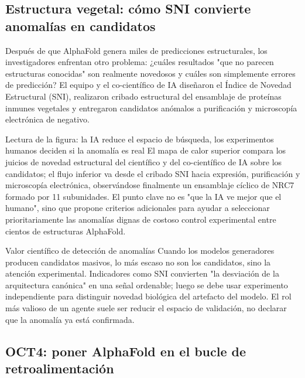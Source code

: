\subsection{Estructura vegetal: cómo SNI convierte anomalías en candidatos}

Después de que AlphaFold genera miles de predicciones estructurales, los investigadores enfrentan otro problema: ¿cuáles resultados "que no parecen estructuras conocidas" son realmente novedosos y cuáles son simplemente errores de predicción? El equipo y el co-científico de IA diseñaron el Índice de Novedad Estructural (SNI), realizaron cribado estructural del ensamblaje de proteínas inmunes vegetales y entregaron candidatos anómalos a purificación y microscopía electrónica de negativo.


\begin{knowledgebox}{Lectura de la figura: la IA reduce el espacio de búsqueda, los experimentos humanos deciden si la anomalía es real}
El mapa de calor superior compara los juicios de novedad estructural del científico y del co-científico de IA sobre los candidatos; el flujo inferior va desde el cribado SNI hacia expresión, purificación y microscopía electrónica, observándose finalmente un ensamblaje cíclico de NRC7 formado por 11 subunidades. El punto clave no es "que la IA ve mejor que el humano", sino que propone criterios adicionales para ayudar a seleccionar prioritariamente las anomalías dignas de costoso control experimental entre cientos de estructuras AlphaFold.
\end{knowledgebox}

\begin{importantbox}{Valor científico de detección de anomalías}
Cuando los modelos generadores producen candidatos masivos, lo más escaso no son los candidatos, sino la atención experimental. Indicadores como SNI convierten "la desviación de la arquitectura canónica" en una señal ordenable; luego se debe usar experimento independiente para distinguir novedad biológica del artefacto del modelo. El rol más valioso de un agente suele ser reducir el espacio de validación, no declarar que la anomalía ya está confirmada.
\end{importantbox}

\subsection{OCT4: poner AlphaFold en el bucle de retroalimentación}

